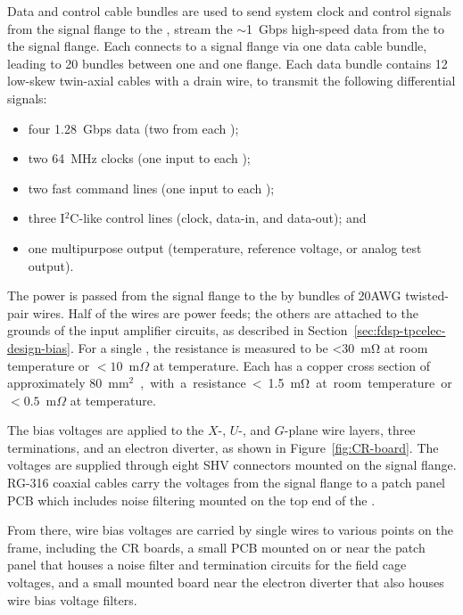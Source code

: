 Data and control cable bundles are used to send system clock and control signals from the 
signal flange to the , stream the $\sim$\SI{1}{Gbps} high-speed data from the  to the signal flange.  Each  
connects to a signal flange via one data cable bundle, leading to 20 bundles between one  and one flange.  Each data bundle contains 12 low-skew twin-axial cables with a drain wire, 
to transmit the following differential signals:
\begin{itemize}
    \item four \SI{1.28}{Gbps} data (two from each );
    \item two \SI{64}{MHz} clocks (one input to each );
    \item two fast command lines (one input to each );
    \item three I$^2$C-like control lines (clock, data-in, and data-out); and
    \item one multipurpose  output (temperature, reference voltage, or analog test output).
\end{itemize}

The  power is passed from the signal flange to the  by bundles of
20AWG twisted-pair wires. Half of the wires are power feeds; the others
are attached to the grounds of the input amplifier circuits, as described in Section~\ref{sec:fdsp-tpcelec-design-bias}.
For a single , the resistance is measured to be  <\SI{30}{\milli\ohm} at room temperature or $<10$~m$\Omega$ at 
\lar temperature. Each  has a copper cross section of approximately %
\SI{80}{mm$^2$}, with a 
resistance <\SI{1.5}{\milli\ohm} at room temperature or $<0.5$~m$\Omega$ at \lar temperature.

The bias voltages are applied to the $X$-, $U$-, and $G$-plane wire layers, three  terminations, 
and an electron diverter, as shown in Figure~\ref{fig:CR-board}. The voltages are supplied 
through eight SHV connectors mounted on the signal flange. RG-316 coaxial cables carry the voltages 
from the signal flange to a patch panel PCB which includes noise filtering mounted on the top 
end of the . 

From there, wire bias voltages are carried by single wires to 
various points on the  frame, including the CR boards, a small PCB mounted on or near 
the patch panel that houses a noise filter and termination circuits for the field cage voltages, and 
a small mounted board near the electron diverter that also houses wire bias voltage filters.

